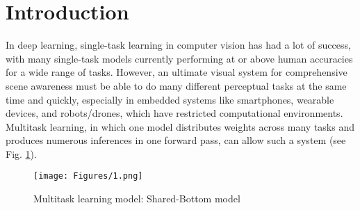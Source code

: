 \documentclass{article}
\begin{document}
\section{Introduction}
In deep learning, single-task learning in computer vision has had a lot of success, with many single-task models currently performing at or above human accuracies for a wide range of tasks. However, an ultimate visual system for comprehensive scene awareness must be able to do many different perceptual tasks at the same time and quickly, especially in embedded systems like smartphones, wearable devices, and robots/drones, which have restricted computational environments. Multitask learning, in which one model distributes weights across many tasks and produces numerous inferences in one forward pass, can allow such a system (see Fig. \ref{mac}).
\begin{figure}[h]
    \centering
{\texttt{[image: Figures/1.png]}}
\caption{Multitask learning model: Shared-Bottom model}
    \label{mac}
\end{figure}
\end{document}
